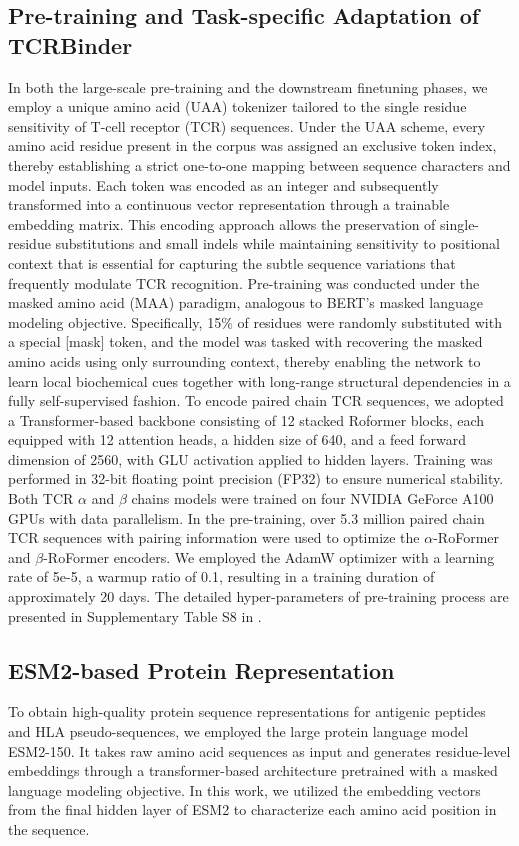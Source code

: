 \documentclass[10pt,letterpaper]{article}
\begin{document}
\subsection*{Pre-training and Task-specific Adaptation of TCRBinder}
In both the large-scale pre-training and the downstream finetuning phases, we employ a unique amino acid (UAA) tokenizer tailored to the single residue sensitivity of T-cell receptor (TCR) sequences. Under the UAA scheme, every amino acid residue present in the corpus was assigned an exclusive token index, thereby establishing a strict one-to-one mapping between sequence characters and model inputs. Each token was encoded as an integer and subsequently transformed into a continuous vector representation through a trainable embedding matrix. This encoding approach allows the preservation of single-residue substitutions and small indels while maintaining sensitivity to positional context that is essential for capturing the subtle sequence variations that frequently modulate TCR recognition. Pre-training was conducted under the masked amino acid (MAA) paradigm, analogous to BERT’s masked language modeling objective. Specifically, 15\% of residues were randomly substituted with a special [mask] token, and the model was tasked with recovering the masked amino acids using only surrounding context, thereby enabling the network to learn local biochemical cues together with long-range structural dependencies in a fully self-supervised fashion. To encode paired chain TCR sequences, we adopted a Transformer-based backbone consisting of 12 stacked Roformer blocks, each equipped with 12 attention heads, a hidden size of 640, and a feed forward dimension of 2560, with GLU activation applied to hidden layers. Training was performed in 32-bit floating point precision (FP32) to ensure numerical stability. Both TCR $\alpha$ and $\beta$ chains models were trained on four NVIDIA GeForce A100 GPUs with data parallelism. In the pre-training, over 5.3 million paired chain TCR sequences with pairing information were used to optimize the $\alpha$-RoFormer and $\beta$-RoFormer encoders. We employed the AdamW optimizer with a learning rate of 5e-5, a warmup ratio of 0.1, resulting in a training duration of approximately 20 days. The detailed hyper-parameters of pre-training process are presented in Supplementary Table S8 in .


\subsection*{ESM2-based Protein Representation}
To obtain high-quality protein sequence representations for antigenic peptides and HLA pseudo-sequences, we employed the large protein language model ESM2-150. It takes raw amino acid sequences as input and generates residue-level embeddings through a transformer-based architecture pretrained with a masked language modeling objective. In this work, we utilized the embedding vectors from the final hidden layer of ESM2 to characterize each amino acid position in the sequence.
\end{document}
